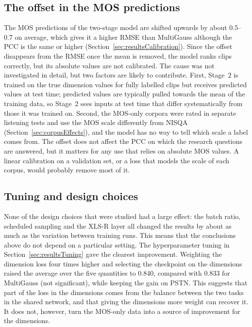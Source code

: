 \documentclass[
english,                 %
bibtex,                  %
includeExtraAbstracts, %
]{kththesis}
\numberwithin{listing}{chapter}
\begin{document}
\subsection{The offset in the MOS predictions}

The MOS predictions of the two-stage model are shifted upwards by about 0.5--0.7 on average, which gives it a higher RMSE than MultiGauss although the PCC is the same or higher (Section~\ref{sec:resultsCalibration}). Since the offset disappears from the RMSE once the mean is removed, the model ranks clips correctly, but its absolute values are not calibrated. The cause was not investigated in detail, but two factors are likely to contribute. First, Stage~2 is trained on the true dimension values for fully labelled clips but receives predicted values at test time; predicted values are typically pulled towards the mean of the training data, so Stage~2 sees inputs at test time that differ systematically from those it was trained on. Second, the MOS-only corpora were rated in separate listening tests and use the MOS scale differently from NISQA (Section~\ref{sec:corpusEffects}), and the model has no way to tell which scale a label comes from. The offset does not affect the PCC on which the research questions are answered, but it matters for any use that relies on absolute MOS values. A linear calibration on a validation set, or a loss that models the scale of each corpus, would probably remove most of it.

\subsection{Tuning and design choices}

None of the design choices that were studied had a large effect: the batch ratio, scheduled sampling and the XLS-R layer all changed the results by about as much as the variation between training runs. This means that the conclusions above do not depend on a particular setting. The hyperparameter tuning in Section~\ref{sec:resultsTuning} gave the clearest improvement. Weighting the dimension loss four times higher and selecting the checkpoint on the dimensions raised the average over the five quantities to 0.840, compared with 0.833 for MultiGauss (not significant), while keeping the gain on PSTN. This suggests that part of the loss in the dimensions comes from the balance between the two tasks in the shared network, and that giving the dimensions more weight can recover it. It does not, however, turn the MOS-only data into a source of improvement for the dimensions.
\end{document}
